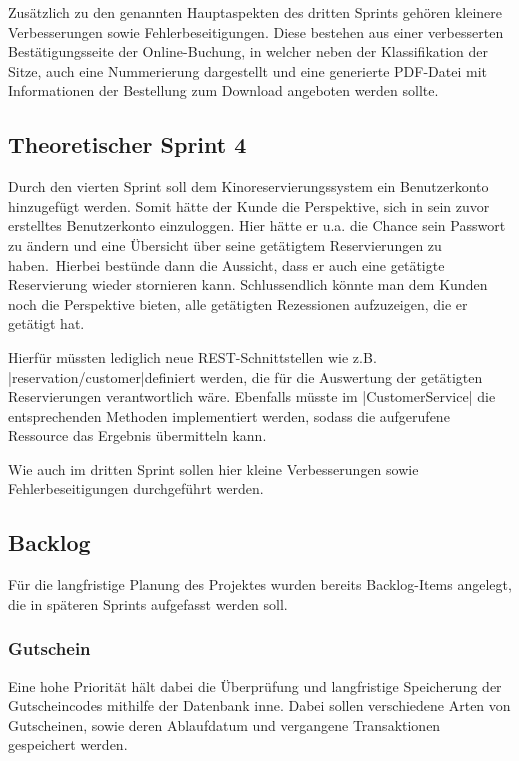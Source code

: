 Zusätzlich zu den genannten Hauptaspekten des dritten Sprints gehören kleinere Verbesserungen sowie Fehlerbeseitigungen.
Diese bestehen aus einer verbesserten Bestätigungsseite der Online-Buchung, in welcher neben der Klassifikation der Sitze, auch eine Nummerierung dargestellt und eine generierte PDF-Datei mit Informationen der Bestellung zum Download angeboten werden sollte.

\subsection*{Theoretischer Sprint 4}
\label{ssssec:sprint_benuterkonto}
\authorsection{\authorSG}
Durch den vierten Sprint soll dem Kinoreservierungssystem ein Benutzerkonto hinzugefügt werden.
Somit hätte der Kunde die Perspektive, sich in sein zuvor erstelltes Benutzerkonto einzuloggen.
Hier hätte er u.a. die Chance sein Passwort zu ändern und eine Übersicht über seine getätigtem Reservierungen zu haben.\
Hierbei bestünde dann die Aussicht, dass er auch eine getätigte Reservierung wieder stornieren kann.
Schlussendlich könnte man dem Kunden noch die Perspektive bieten, alle getätigten Rezessionen aufzuzeigen, die er getätigt hat. 

Hierfür müssten lediglich neue \acs{REST}-Schnittstellen wie z.B. \jinline|reservation/customer|definiert werden, die für die Auswertung der getätigten Reservierungen verantwortlich wäre.
Ebenfalls müsste im \jinline|CustomerService| die entsprechenden Methoden implementiert werden, sodass die aufgerufene Ressource das Ergebnis übermitteln kann.

Wie auch im dritten Sprint sollen hier kleine Verbesserungen sowie Fehlerbeseitigungen durchgeführt werden.

\subsection{Backlog}
\label{ssec:backlog}
\multipleauthorsection{\authorRF}{\authorEJ}
Für die langfristige Planung des Projektes wurden bereits Backlog-Items angelegt, die in späteren Sprints aufgefasst werden soll.

\subsubsection*{Gutschein}
\label{ssssec:gutschein}
Eine hohe Priorität hält dabei die Überprüfung und langfristige Speicherung der Gutscheincodes mithilfe der Datenbank inne.
Dabei sollen verschiedene Arten von Gutscheinen, sowie deren Ablaufdatum und vergangene Transaktionen gespeichert werden.

